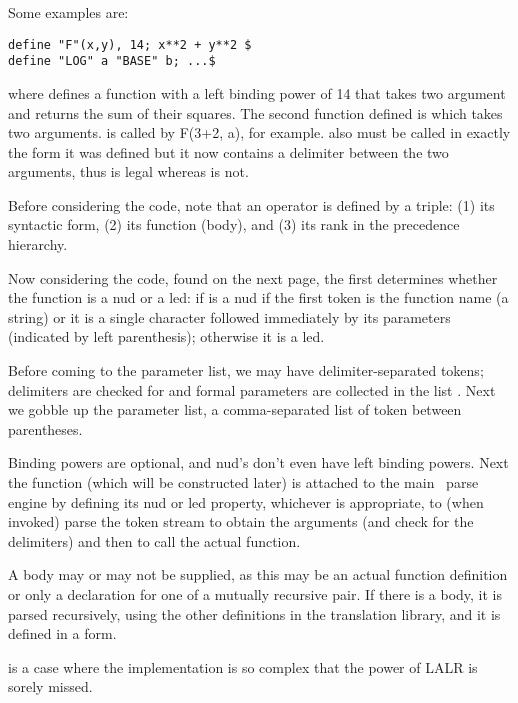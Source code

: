 Some examples are:

{\footnotesize\begin{verbatim}
define "F"(x,y), 14; x**2 + y**2 $
define "LOG" a "BASE" b; ...$
\end{verbatim}}

\noindent where  defines a function with a left binding power of 14 that takes two
argument and returns the sum of their squares.  The second function
defined is  which takes two arguments.   is called by
F(3+2, a), for example.   also must be called in exactly the form
it was defined but it now contains a delimiter between the two arguments,
thus  is legal whereas  is not.

Before considering the code, note that an operator is defined by a triple:
(1) its syntactic form, (2) its function (body), and (3) its rank in the
precedence hierarchy.

\addtocounter{page}{1}


Now considering the code, found on the next page, the first 
determines whether the function is a nud or a led: if is a nud if the first
token is the function name (a string) or it is a single character followed
immediately by its parameters (indicated by left parenthesis); otherwise it
is a led.

Before coming to the parameter list, we may have delimiter-separated
tokens; delimiters are checked for and formal parameters are collected in the
list .
Next we gobble up the parameter list, a comma-separated list of token
between parentheses.

Binding powers are optional, and nud's don't even have left binding powers.
Next the function (which will be constructed later) is attached to the
main \cgol\ parse engine by defining its nud or led property, whichever is
appropriate, to (when invoked) parse the token stream to obtain the
arguments (and check for the delimiters) and then to call the actual
function.

A body may or may not be supplied, as this may be an actual function
definition or only a declaration for one of a mutually recursive pair.
If there is a body, it is parsed recursively, using the other definitions
in the translation library, and it is defined in a  form.

 is a case where the implementation is so complex that the
power of LALR is sorely missed.




